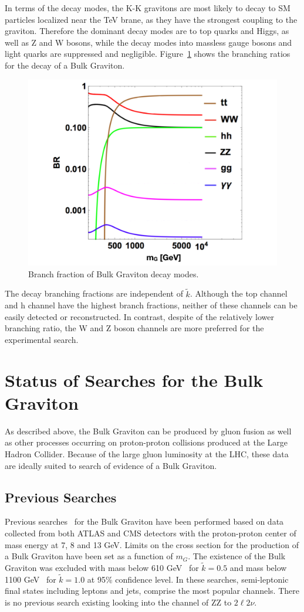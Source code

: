 In terms of the decay modes, the K-K gravitons are most likely to decay to SM particles localized near the TeV brane, as they have the strongest coupling to the graviton. Therefore the dominant decay modes are to top quarks and Higgs, as well as Z and W bosons, while the decay modes into massless gauge bosons and light quarks are suppressed and negligible. Figure~\ref{fig:intro_Gbr} shows the branching ratios for the decay of a Bulk Graviton.
\begin{figure}[htbp]
\begin{center}
\includegraphics[width=0.5\linewidth]{figures/intro_Gbr.pdf}
\caption{Branch fraction of Bulk Graviton decay modes.}
\label{fig:intro_Gbr}
\end{center}
\end{figure}
The decay branching fractions are independent of $\tilde{k}$. Although the top channel and h channel have the highest branch fractions, neither of these channels can be easily detected or reconstructed. In contrast, despite of the relatively lower branching ratio, the W and Z boson channels are more preferred for the experimental search.

\section{Status of Searches for the Bulk Graviton} 
As described above, the Bulk Graviton can be produced by gluon fusion as well as other processes occurring on proton-proton collisions produced at the Large Hadron Collider. Because of the large gluon luminosity at the LHC, these data are ideally suited to search of evidence of a Bulk Graviton.
\subsection{Previous Searches}
Previous searches~\cite{Aad:2012nev,Aad:2013wxa,Aad:2014xka,Chatrchyan:2012baa,Khachatryan:2014gha,Aaboud:2016okv} for the Bulk Graviton have been performed based on data collected from both ATLAS and CMS detectors with the proton-proton center of mass energy at 7, 8 and 13 GeV. Limits on the cross section for the production of a Bulk Graviton have been set as a function of $m_{G}$. The existence of the Bulk Graviton was excluded with mass below 610 GeV~\cite{Chatrchyan:2012baa} for $\tilde{k}=0.5$ and mass below 1100 GeV~\cite{Aaboud:2016okv} for $\tilde{k}=1.0$ at 95\% confidence level. In these searches, semi-leptonic final states including leptons and jets, comprise the most popular channels. There is no previous search existing looking into the channel of ZZ to $2\ell 2\nu$.
